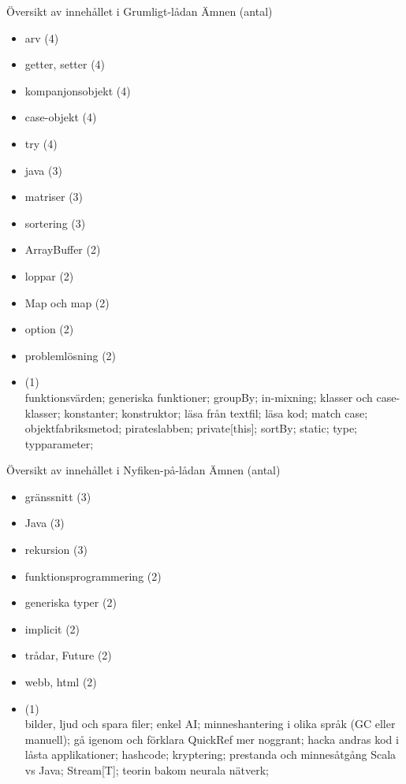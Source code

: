 

\ifkompendium\else

\begin{Slide}{Översikt av innehållet i Grumligt-lådan}\SlideFontSmall
Ämnen (antal)
\begin{multicols}{2}
\begin{itemize}\SlideFontTiny
\item arv (4)
\item getter, setter (4)
\item kompanjonsobjekt (4)
\item case-objekt (4)
\item try (4)
\item java (3)
\item matriser (3)
\item sortering (3)
\item ArrayBuffer (2)
\item loppar (2)
\item Map och map (2)
\item option (2)
\item problemlösning (2)
\item (1) \\
funktionsvärden; 
generiska funktioner;
groupBy;
in-mixning;
klasser och case-klasser;
konstanter;
konstruktor;
läsa från textfil;
läsa kod;
match case;
objektfabriksmetod;
pirateslabben;
private[this];
sortBy;
static;
type;
typparameter;

\end{itemize}
\end{multicols}
\end{Slide}

\begin{Slide}{Översikt av innehållet i Nyfiken-på-lådan}\SlideFontSmall
Ämnen (antal)
\begin{multicols}{2}
\begin{itemize}\SlideFontTiny
\item gränssnitt (3)
\item Java (3)
\item rekursion (3)
\item funktionsprogrammering (2)
\item generiska typer (2)
\item implicit (2)
\item trådar, Future (2)
\item webb, html (2)
\item (1) \\
bilder, ljud och spara filer; 
enkel AI; 
minneshantering i olika språk (GC eller manuell);
gå igenom och förklara QuickRef mer noggrant;
hacka andras kod i låsta applikationer;
hashcode;
kryptering;
prestanda och minnesåtgång Scala vs Java;
Stream[T];
teorin bakom neurala nätverk;
\end{itemize}
\end{multicols}
\end{Slide}


\fi










